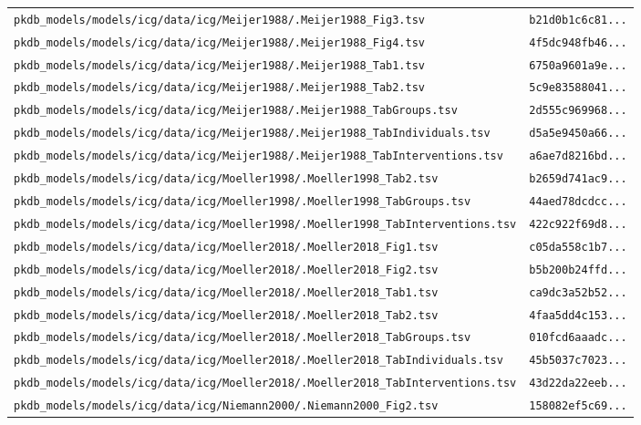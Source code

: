 \documentclass{article}
\begin{document}
\begin{longtable}{ll}
\texttt{pkdb\_models/models/icg/data/icg/Meijer1988/.Meijer1988\_Fig3.tsv} & \texttt{b21d0b1c6c81...} \\
\texttt{pkdb\_models/models/icg/data/icg/Meijer1988/.Meijer1988\_Fig4.tsv} & \texttt{4f5dc948fb46...} \\
\texttt{pkdb\_models/models/icg/data/icg/Meijer1988/.Meijer1988\_Tab1.tsv} & \texttt{6750a9601a9e...} \\
\texttt{pkdb\_models/models/icg/data/icg/Meijer1988/.Meijer1988\_Tab2.tsv} & \texttt{5c9e83588041...} \\
\texttt{pkdb\_models/models/icg/data/icg/Meijer1988/.Meijer1988\_TabGroups.tsv} & \texttt{2d555c969968...} \\
\texttt{pkdb\_models/models/icg/data/icg/Meijer1988/.Meijer1988\_TabIndividuals.tsv} & \texttt{d5a5e9450a66...} \\
\texttt{pkdb\_models/models/icg/data/icg/Meijer1988/.Meijer1988\_TabInterventions.tsv} & \texttt{a6ae7d8216bd...} \\
\texttt{pkdb\_models/models/icg/data/icg/Moeller1998/.Moeller1998\_Tab2.tsv} & \texttt{b2659d741ac9...} \\
\texttt{pkdb\_models/models/icg/data/icg/Moeller1998/.Moeller1998\_TabGroups.tsv} & \texttt{44aed78dcdcc...} \\
\texttt{pkdb\_models/models/icg/data/icg/Moeller1998/.Moeller1998\_TabInterventions.tsv} & \texttt{422c922f69d8...} \\
\texttt{pkdb\_models/models/icg/data/icg/Moeller2018/.Moeller2018\_Fig1.tsv} & \texttt{c05da558c1b7...} \\
\texttt{pkdb\_models/models/icg/data/icg/Moeller2018/.Moeller2018\_Fig2.tsv} & \texttt{b5b200b24ffd...} \\
\texttt{pkdb\_models/models/icg/data/icg/Moeller2018/.Moeller2018\_Tab1.tsv} & \texttt{ca9dc3a52b52...} \\
\texttt{pkdb\_models/models/icg/data/icg/Moeller2018/.Moeller2018\_Tab2.tsv} & \texttt{4faa5dd4c153...} \\
\texttt{pkdb\_models/models/icg/data/icg/Moeller2018/.Moeller2018\_TabGroups.tsv} & \texttt{010fcd6aaadc...} \\
\texttt{pkdb\_models/models/icg/data/icg/Moeller2018/.Moeller2018\_TabIndividuals.tsv} & \texttt{45b5037c7023...} \\
\texttt{pkdb\_models/models/icg/data/icg/Moeller2018/.Moeller2018\_TabInterventions.tsv} & \texttt{43d22da22eeb...} \\
\texttt{pkdb\_models/models/icg/data/icg/Niemann2000/.Niemann2000\_Fig2.tsv} & \texttt{158082ef5c69...} \\

\end{longtable}
\end{document}
